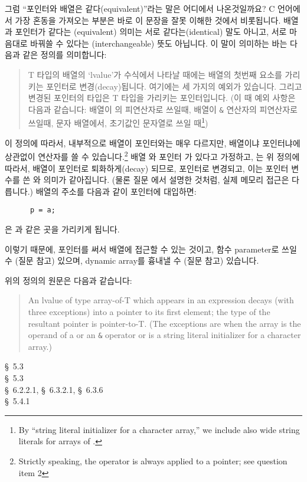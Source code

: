 \begin{faq}
	그럼 ``포인터와 배열은 같다(equivalent)''라는
	말은 어디에서 나온것일까요?
\A
	C 언어에서 가장 혼동을 가져오는 부분은 바로 이 문장을 잘못 이해한
	것에서 비롯됩니다.  배열과 포인터가 같다는 (equivalent) 의미는
	서로 같다는(identical) 말도 아니고,
	서로 마음대로 바꿔쓸 수 있다는 (interchangeable) 뜻도 아닙니다. 
	이 말이 의미하는 바는 다음과 같은 정의를 의미합니다:
\begin{quote}
	T 타입의 배열의 `lvalue'가 수식에서 나타날 때에는 배열의 첫번째
	요소를 가리키는 포인터로 변경(decay)됩니다.  여기에는 세 가지의
	예외가 있습니다.  그리고 변경된 포인터의 타입은 T 타입을 가리키는
	포인터입니다.
	(이 때 예외 사항은 다음과 같습니다:
	배열이 의 피연산자로 쓰일때, 배열이 \verb+&+ 연산자의
	피연산자로 쓰일때, 문자 배열에서, 초기값인 문자열로 쓰일
	때\footnote{By ``string literal initializer for a character array,''
	  we include also wide string literals for arrays of .})
\end{quote}

	이 정의에 따라서, 내부적으로 배열이 포인터와는 매우 다르지만,
	배열이냐 포인터냐에 상관없이 \TT{[]} 연산자를 쓸 수
	있습니다.\footnote{Strictly speaking, the \TT{[]} operator is
	  always applied to a pointer; see question  item 2}
	배열 와 포인터 가 있다고 가정하고, 는
	위 정의에 따라서, 배열이 포인터로 퇴화하게(decay) 되므로,
	포인터로 변경되고, 이는 포인터 변수를 쓴 와 의미가
	같아집니다. (물론 질문 에서 설명한 것처럼, 실제 메모리 접근은
	다릅니다.) 배열의 주소를 다음과 같이 포인터에 대입하면:

	\begin{verbatim}
	  p = a;
	\end{verbatim}
	\noindent {}은 과 같은 곳을 가리키게 됩니다.

	이렇기 때문에, 포인터를 써서 배열에 접근할 수 있는 것이고, 함수
	parameter로 쓰일 수 (질문  참고) 있으며, dynamic array를
	흉내낼 수 (질문  참고) 있습니다.


\T
	위의 정의의 원문은 다음과 같습니다:
\begin{quote}
	An lvalue of type array-of-T which appears in an
	expression decays (with three exceptions) into a
	pointer to its first element; the type of the
	resultant pointer is pointer-to-T. (The exceptions are when the array
	is the operand of a  or an \verb+&+ operator or is a string
	literal initializer for a character array.)
\end{quote}

\R
	\cite{kr1} \S\ 5.3  \\
	\cite{kr2} \S\ 5.3  \\
	\cite{c89} \S\ 6.2.2.1, \S\ 6.3.2.1, \S\ 6.3.6 \\
	\cite{hs} \S\ 5.4.1 
\end{faq}


